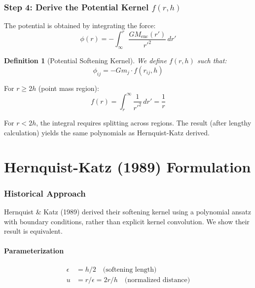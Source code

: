 \documentclass[12pt]{article}
\newtheorem{definition}{Definition}
\begin{document}
\section{Step 4: Derive the Potential Kernel $f(r, h)$}

The potential is obtained by integrating the force:
\begin{equation}
\phi(r) = -\int_\infty^r \frac{G M_{\text{enc}}(r')}{r'^2} \, dr'
\end{equation}

\begin{definition}[Potential Softening Kernel]
We define $f(r, h)$ such that:
\begin{equation}
\phi_{ij} = -G m_j \cdot f(r_{ij}, h)
\end{equation}
\end{definition}

For $r \geq 2h$ (point mass region):
\begin{equation}
f(r) = \int_r^\infty \frac{1}{r'^2} \, dr' = \frac{1}{r}
\end{equation}

For $r < 2h$, the integral requires splitting across regions. The result (after
lengthy calculation) yields the same polynomials as Hernquist-Katz derived.

\part{Hernquist-Katz (1989) Formulation}

\section{Historical Approach}

Hernquist \& Katz (1989) derived their softening kernel using a polynomial ansatz
with boundary conditions, rather than explicit kernel convolution. We show their
result is equivalent.

\subsection{Parameterization}
\begin{align}
\epsilon &= h/2 \quad \text{(softening length)} \\
u &= r/\epsilon = 2r/h \quad \text{(normalized distance)}
\end{align}
\end{document}

